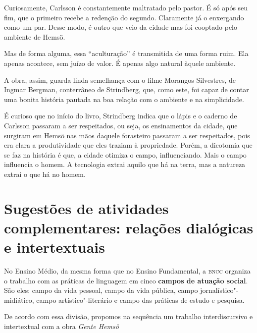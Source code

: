 \documentclass[12pt]{extarticle}
\begin{document}
Curiosamente, Carlsson é constantemente maltratado pelo pastor. É só
após seu fim, que o primeiro recebe a redenção do segundo. Claramente já
o enxergando como um par. Desse modo, é outro que veio da cidade mas foi
cooptado pelo ambiente de Hemsö.

Mas de forma alguma, essa ``aculturação'' é transmitida de uma forma
ruim. Ela apenas acontece, sem juízo de valor. É apenas algo natural
àquele ambiente.

A obra, assim, guarda linda semelhança com o filme Morangos Silvestres,
de Ingmar Bergman, conterrâneo de Strindberg, que, como este, foi capaz
de contar uma bonita história pautada na boa relação com o ambiente e na
simplicidade.






É curioso que no início do livro, Strindberg indica que o lápis e o
caderno de Carlsson passaram a ser respeitados, ou seja, os ensinamentos
da cidade, que surgiram em Hemsö nas mãos daquele forasteiro passaram a
ser respeitados, pois era clara a produtividade que eles traziam à
propriedade. Porém, a dicotomia que se faz na história é que, a cidade
otimiza o campo, influenciando. Mais o campo influencia o homem. A
tecnologia extrai aquilo que há na terra, mas a natureza extrai o que há
no homem.




\section{Sugestões de atividades complementares: relações dialógicas e
intertextuais}


No Ensino Médio, da mesma forma que no Ensino Fundamental, a \textsc{bncc}
organiza o trabalho com as práticas de linguagem em cinco \textbf{campos
de atuação social}. São eles: campo da vida pessoal, campo da vida
pública, campo jornalístico"-midiático, campo artístico"-literário e campo
das práticas de estudo e pesquisa.

De acordo com essa divisão, propomos na sequência um trabalho
interdiscursivo e intertextual com a obra \emph{Gente Hemsö}
\end{document}
